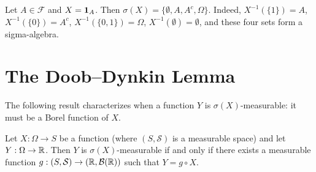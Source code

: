 \documentclass[11pt,a4paper]{article}
\begin{document}
\begin{example}
\label{ex:sigma_indicator}
Let $A \in \mathcal{F}$ and $X = \mathbf{1}_A$. Then
$\sigma(X) = \{\emptyset, A, A^c, \Omega\}$. Indeed,
$X^{-1}(\{1\}) = A$, $X^{-1}(\{0\}) = A^c$,
$X^{-1}(\{0,1\}) = \Omega$, $X^{-1}(\emptyset) = \emptyset$, and these
four sets form a sigma-algebra.
\end{example}


\section{The Doob--Dynkin Lemma}
\label{sec:doob_dynkin}

The following result characterizes when a function $Y$ is
$\sigma(X)$-measurable: it must be a Borel function of $X$.

\begin{keyresult}[title={Doob--Dynkin Lemma}]
\begin{theorem}
\label{thm:doob_dynkin}
Let $X: \Omega \to S$ be a function (where $(S, \mathcal{S})$ is a
measurable space) and let $Y: \Omega \to \mathbb{R}$. Then $Y$ is
$\sigma(X)$-measurable if and only if there exists a measurable function
$g: (S, \mathcal{S}) \to (\mathbb{R}, \mathcal{B}(\mathbb{R}))$ such that $Y = g \circ X$.
\end{theorem}
\end{keyresult}
\end{document}
